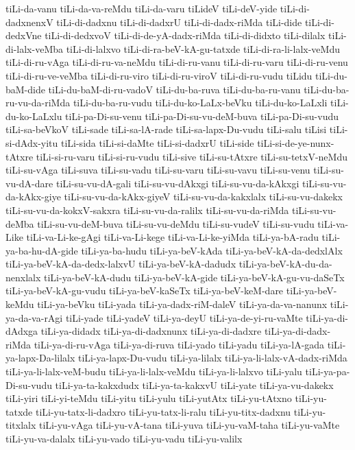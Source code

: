 {tiLi-da-vanu
tiLi-da-va-reMdu
tiLi-da-varu
tiLideV
tiLi-deV-yide
tiLi-di-dadxnenxV
tiLi-di-dadxnu
tiLi-di-dadxrU
tiLi-di-dadx-riMda
tiLi-dide
tiLi-di-dedxVne
tiLi-di-dedxvoV
tiLi-di-de-yA-dadx-riMda
tiLi-di-didxto
tiLi-dilalx
tiLi-di-lalx-veMba
tiLi-di-lalxvo
tiLi-di-ra-beV-kA-gu-tatxde
tiLi-di-ra-li-lalx-veMdu
tiLi-di-ru-vAga
tiLi-di-ru-va-neMdu
tiLi-di-ru-vanu
tiLi-di-ru-varu
tiLi-di-ru-venu
tiLi-di-ru-ve-veMba
tiLi-di-ru-viro
tiLi-di-ru-viroV
tiLi-di-ru-vudu
tiLidu
tiLi-du-baM-dide
tiLi-du-baM-di-ru-vadoV
tiLi-du-ba-ruva
tiLi-du-ba-ru-vanu
tiLi-du-ba-ru-vu-da-riMda
tiLi-du-ba-ru-vudu
tiLi-du-ko-LaLx-beVku
tiLi-du-ko-LaLxli
tiLi-du-ko-LaLxlu
tiLi-pa-Di-su-venu
tiLi-pa-Di-su-vu-deM-buva
tiLi-pa-Di-su-vudu
tiLi-sa-beVkoV
tiLi-sade
tiLi-sa-lA-rade
tiLi-sa-lapx-Du-vudu
tiLi-salu
tiLisi
tiLi-si-dAdx-yitu
tiLi-sida
tiLi-si-daMte
tiLi-si-dadxrU
tiLi-side
tiLi-si-de-ye-nunx-tAtxre
tiLi-si-ru-varu
tiLi-si-ru-vudu
tiLi-sive
tiLi-su-tAtxre
tiLi-su-tetxV-neMdu
tiLi-su-vAga
tiLi-suva
tiLi-su-vadu
tiLi-su-varu
tiLi-su-vavu
tiLi-su-venu
tiLi-su-vu-dA-dare
tiLi-su-vu-dA-gali
tiLi-su-vu-dAkxgi
tiLi-su-vu-da-kAkxgi
tiLi-su-vu-da-kAkx-giye
tiLi-su-vu-da-kAkx-giyeV
tiLi-su-vu-da-kakxlalx
tiLi-su-vu-dakekx
tiLi-su-vu-da-kokxV-sakxra
tiLi-su-vu-da-ralilx
tiLi-su-vu-da-riMda
tiLi-su-vu-deMba
tiLi-su-vu-deM-buva
tiLi-su-vu-deMdu
tiLi-su-vudeV
tiLi-su-vudu
tiLi-va-Like
tiLi-va-Li-ke-gAgi
tiLi-va-Li-kege
tiLi-va-Li-ke-yiMda
tiLi-ya-bA-radu
tiLi-ya-ba-hu-dA-gide
tiLi-ya-ba-hudu
tiLi-ya-beV-kAda
tiLi-ya-beV-kA-da-dedxlAlx
tiLi-ya-beV-kA-da-dedx-lalxvU
tiLi-ya-beV-kA-dadudx
tiLi-ya-beV-kA-du-da-nenxlalx
tiLi-ya-beV-kA-dudu
tiLi-ya-beV-kA-gide
tiLi-ya-beV-kA-gu-vu-daSeTx
tiLi-ya-beV-kA-gu-vudu
tiLi-ya-beV-kaSeTx
tiLi-ya-beV-keM-dare
tiLi-ya-beV-keMdu
tiLi-ya-beVku
tiLi-yada
tiLi-ya-dadx-riM-daleV
tiLi-ya-da-va-nanunx
tiLi-ya-da-va-rAgi
tiLi-yade
tiLi-yadeV
tiLi-ya-deyU
tiLi-ya-de-yi-ru-vaMte
tiLi-ya-di-dAdxga
tiLi-ya-didadx
tiLi-ya-di-dadxnunx
tiLi-ya-di-dadxre
tiLi-ya-di-dadx-riMda
tiLi-ya-di-ru-vAga
tiLi-ya-di-ruva
tiLi-yado
tiLi-yadu
tiLi-ya-lA-gada
tiLi-ya-lapx-Da-lilalx
tiLi-ya-lapx-Du-vudu
tiLi-ya-lilalx
tiLi-ya-li-lalx-vA-dadx-riMda
tiLi-ya-li-lalx-veM-budu
tiLi-ya-li-lalx-veMdu
tiLi-ya-li-lalxvo
tiLi-yalu
tiLi-ya-pa-Di-su-vudu
tiLi-ya-ta-kakxdudx
tiLi-ya-ta-kakxvU
tiLi-yate
tiLi-ya-vu-dakekx
tiLi-yiri
tiLi-yi-teMdu
tiLi-yitu
tiLi-yulu
tiLi-yutAtx
tiLi-yu-tAtxno
tiLi-yu-tatxde
tiLi-yu-tatx-li-dadxro
tiLi-yu-tatx-li-ralu
tiLi-yu-titx-dadxnu
tiLi-yu-titxlalx
tiLi-yu-vAga
tiLi-yu-vA-tana
tiLi-yuva
tiLi-yu-vaM-taha
tiLi-yu-vaMte
tiLi-yu-va-dalalx
tiLi-yu-vado
tiLi-yu-vadu
tiLi-yu-valilx
}
